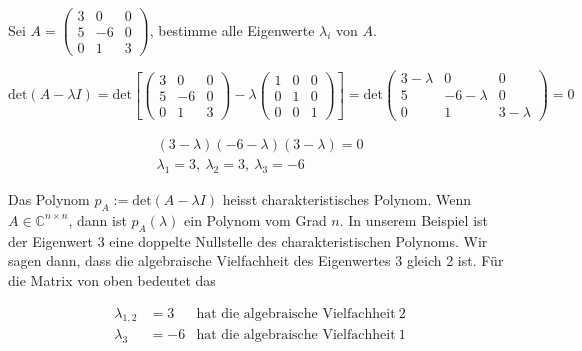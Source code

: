 Sei \( A = \begin{pmatrix} 3 & 0 & 0 \\ 5 & -6 & 0 \\ 0 & 1 & 3 \end{pmatrix} \), bestimme alle Eigenwerte \( \lambda_i \) von \( A \).

\vspace{1\baselineskip}

\begin{equation*}
    \text{det}(A - \lambda I) = \text{det} \left[ \begin{pmatrix} 3 & 0 & 0 \\ 5 & -6 & 0 \\ 0 & 1 & 3 \end{pmatrix} - \lambda \begin{pmatrix} 1 & 0 & 0 \\ 0 & 1 & 0 \\ 0 & 0 & 1 \end{pmatrix}\right] = \text{det} \begin{pmatrix} 3-\lambda & 0 & 0 \\ 5 & -6-\lambda & 0 \\ 0 & 1 & 3-\lambda \end{pmatrix} = 0
\end{equation*}

\begin{equation*}
    \begin{aligned}
        (3 - \lambda)(-6 - \lambda)(3 - \lambda) = 0 \\[1em]
        \lambda_1 = 3,\ \lambda_2 = 3,\ \lambda_3 = -6
    \end{aligned}
\end{equation*}

Das Polynom \( p_A := \text{det}(A - \lambda I) \) heisst charakteristisches Polynom. Wenn \( A \in \mathbb{C}^{n \times n} \), dann ist \( p_A(\lambda) \) ein Polynom vom Grad \( n \). In unserem Beispiel ist der Eigenwert 3 eine doppelte Nullstelle des charakteristischen Polynoms. Wir sagen dann, dass die algebraische Vielfachheit des Eigenwertes 3 gleich 2 ist. Für die Matrix von oben bedeutet das

\begin{equation*}
    \begin{aligned}
        \lambda_{1,2} &= 3 &\text{hat die algebraische Vielfachheit}\ 2 \\
        \lambda_3 &= -6 &\text{hat die algebraische Vielfachheit}\ 1
    \end{aligned}
\end{equation*}


